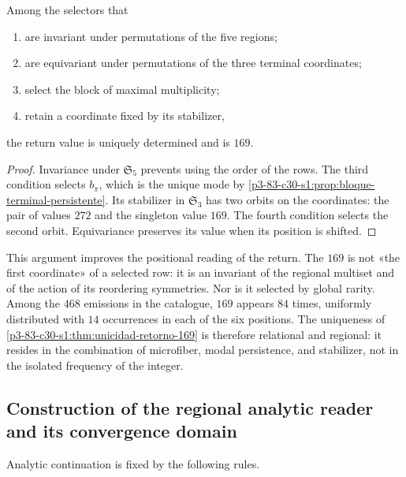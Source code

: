\begin{theorem}
\label{p3-83-c30-s1:thm:unicidad-retorno-169}
Among the selectors that
\begin{enumerate}
  \item are invariant under permutations of the five regions;
  \item are equivariant under permutations of the three terminal
  coordinates;
  \item select the block of maximal multiplicity;
  \item retain a coordinate fixed by its stabilizer,
\end{enumerate}
the return value is uniquely determined and is \(169\).
\end{theorem}

\begin{proof}
Invariance under \(\mathfrak S_5\) prevents using the order of the rows. The
third condition selects \(b_\pi\), which is the unique mode by
\cref{p3-83-c30-s1:prop:bloque-terminal-persistente}. Its stabilizer in
\(\mathfrak S_3\) has two orbits on the coordinates: the pair of
values \(272\) and the singleton value \(169\). The fourth condition selects the
second orbit. Equivariance preserves its value when its position is shifted.
\end{proof}

This argument improves the positional reading of the return. The \(169\) is not
«the first coordinate» of a selected row: it is an invariant of the
regional multiset and of the action of its reordering symmetries.
Nor is it selected by global rarity. Among the \(468\) emissions in the
catalogue, \(169\) appears \(84\) times, uniformly distributed with
\(14\) occurrences in each of the six positions. The uniqueness of
\cref{p3-83-c30-s1:thm:unicidad-retorno-169} is therefore relational and regional: it resides
in the combination of microfiber, modal persistence, and stabilizer, not in the
isolated frequency of the integer.

\subsection{Construction of the regional analytic reader and its convergence domain}
\label{sec:s102:c38:2:3}


Analytic continuation is fixed by the following rules.

